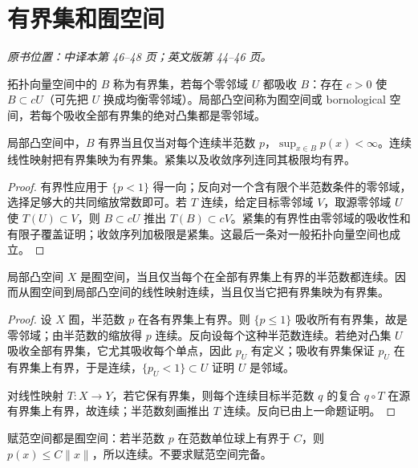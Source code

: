 \section{有界集和囿空间}\label{sec:yosida-01-07}
\noindent\textit{原书位置：中译本第 46--48 页；英文版第 44--46 页。}

\begin{definition}[拓扑有界集与囿空间]
拓扑向量空间中的 $B$ 称为有界集，若每个零邻域 $U$ 都吸收 $B$：存在 $c>0$ 使 $B\subset cU$（可先把 $U$ 换成均衡零邻域）。局部凸空间称为囿空间或 bornological 空间，若每个吸收全部有界集的绝对凸集都是零邻域。
\end{definition}
\begin{proposition}[有界集的半范数判别]\label{prop:y1-bounded}
局部凸空间中，$B$ 有界当且仅当对每个连续半范数 $p$，$\sup_{x\in B}p(x)<\infty$。连续线性映射把有界集映为有界集。紧集以及收敛序列连同其极限均有界。
\end{proposition}
\begin{proof}
有界性应用于 $\{p<1\}$ 得一向；反向对一个含有限个半范数条件的零邻域，选择足够大的共同缩放常数即可。若 $T$ 连续，给定目标零邻域 $V$，取源零邻域 $U$ 使 $T(U)\subset V$，则 $B\subset cU$ 推出 $T(B)\subset cV$。紧集的有界性由零邻域的吸收性和有限子覆盖证明；收敛序列加极限是紧集。这最后一条对一般拓扑向量空间也成立。
\end{proof}

\begin{theorem}[囿空间的等价刻画]\label{thm:y1-bornological}
局部凸空间 $X$ 是囿空间，当且仅当每个在全部有界集上有界的半范数都连续。因而从囿空间到局部凸空间的线性映射连续，当且仅当它把有界集映为有界集。
\end{theorem}
\begin{proof}
设 $X$ 囿，半范数 $p$ 在各有界集上有界。则 $\{p\le1\}$ 吸收所有有界集，故是零邻域；由半范数的缩放得 $p$ 连续。反向设每个这种半范数连续。若绝对凸集 $U$ 吸收全部有界集，它尤其吸收每个单点，因此 $p_U$ 有定义；吸收有界集保证 $p_U$ 在有界集上有界，于是连续，$\{p_U<1\}\subset U$ 证明 $U$ 是邻域。

对线性映射 $T:X\to Y$，若它保有界集，则每个连续目标半范数 $q$ 的复合 $q\circ T$ 在源有界集上有界，故连续；半范数刻画推出 $T$ 连续。反向已由上一命题证明。
\end{proof}
赋范空间都是囿空间：若半范数 $p$ 在范数单位球上有界于 $C$，则 $p(x)\le C\|x\|$，所以连续。不要求赋范空间完备。


